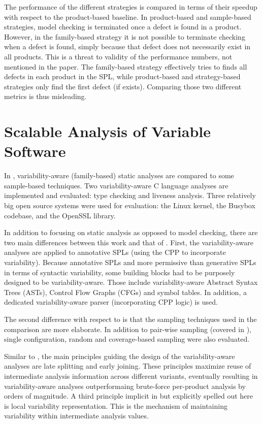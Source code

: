 \documentclass[11pt]{article}
\begin{document}
The performance of the different strategies is compared in terms of their speedup with respect to the product-based baseline. In product-based and sample-based strategies, model checking is terminated once a defect is found in a product. However, in the family-based strategy it is not possible to terminate checking when a defect is found, simply because that defect does not necessarily exist in all products. This is a threat to validity of the performance numbers, not mentioned in the paper. The family-based strategy effectively tries to finds all defects in each product in the SPL, while product-based and strategy-based strategies only find the first defect (if exists). Comparing those two different metrics is thus misleading.

\section{Scalable Analysis of Variable Software}
In \cite{Liebig:2013}, variability-aware (family-based) static analyses are compared to some sample-based techniques. Two variability-aware C language analyses are implemented and evaluated: type checking and liveness analysis. Three relatively big open source systems were used for evaluation: the Linux kernel, the Busybox codebase, and the OpenSSL library.

In addition to focusing on static analysis as opposed to model checking, there are two main differences between this work and that of \cite{Apel:2013}. First, the variability-aware analyses are applied to annotative SPLs (using the CPP to incorporate variability). Because annotative SPLs and more permissive than generative SPLs in terms of syntactic variability, some building blocks had to be purposely designed to be variability-aware. Those include variability-aware Abstract Syntax Trees (ASTs), Control Flow Graphs (CFGs) and symbol tables. In addition, a dedicated variability-aware parser (incorporating CPP logic) is used.

The second difference with respect to \cite{Apel:2013} is that the sampling techniques used in the comparison are more elaborate. In addition to pair-wise sampling (covered in \cite{Apel:2013}), single configuration, random and coverage-based sampling were also evaluated.

Similar to \cite{Apel:2013}, the main principles guiding the design of the variability-aware analyses are late splitting and early joining. These principles maximize reuse of intermediate analysis information across different variants, eventually resulting in variability-aware analyses outperformaing brute-force per-product analysis by orders of magnitude. A third principle implicit in \cite{Apel:2013} but explicitly spelled out here is local variability representation. This is the mechanism of maintaining variability within intermediate analysis values.
\end{document}
